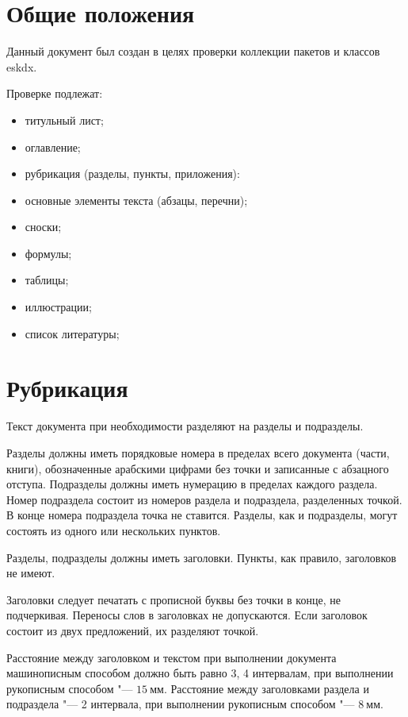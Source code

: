 \section{Общие положения}

\point Данный документ был создан в целях проверки коллекции
пакетов и классов eskdx.

\point Проверке подлежат:

\begin{itemize}
\item титульный лист;
\item оглавление;
\item рубрикация (разделы, пункты, приложения):
\item основные элементы текста (абзацы, перечни);
\item сноски;
\item формулы;
\item таблицы;
\item иллюстрации;
\item список литературы;
\end{itemize}

\section{Рубрикация}

\point Текст документа при необходимости разделяют на разделы и
подразделы.

\point Разделы должны иметь порядковые номера в пределах всего
документа (части, книги), обозначенные арабскими цифрами без точки
и записанные с абзацного отступа. Подразделы должны иметь
нумерацию в пределах каждого раздела. Номер подраздела состоит из
номеров раздела и подраздела, разделенных точкой. В конце номера
подраздела точка не ставится.  Разделы, как и подразделы, могут
состоять из одного или нескольких пунктов.

\point Разделы, подразделы должны иметь заголовки. Пункты, как
правило, заголовков не имеют.

\point Заголовки следует печатать с прописной буквы без точки в
конце, не подчеркивая. Переносы слов в заголовках не допускаются.
Если заголовок состоит из двух предложений, их разделяют точкой.

\point Расстояние между заголовком и текстом при выполнении
документа машинописным способом должно быть равно 3, 4 интервалам,
при выполнении рукописным способом "--- $15~\text{мм}$. Расстояние
между заголовками раздела и подраздела "--- 2 интервала, при
выполнении рукописным способом "--- $8~\text{мм}$.

